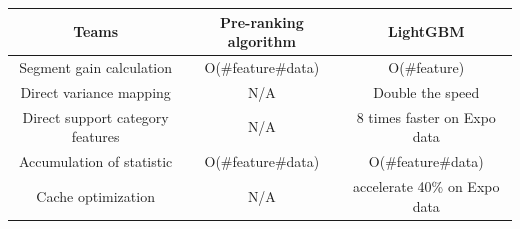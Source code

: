 \documentclass{tikzposter} %
\begin{document}
\begin{columns}
{\begin{tabular}{ c | c | c }
    \toprule
    Teams                               & Pre-ranking algorithm     &  LightGBM    \\
    \toprule
    Segment gain calculation            & O(\#feature\#data)        & O(\#feature) \\       
    Direct variance mapping             & N/A                       & Double the speed                        \\
    Direct support category features    & N/A                       & 8 times faster on Expo data    \\
    Accumulation of statistic           & O(\#feature\#data)        & O(\#feature\#data)                   \\
    Cache optimization                  & N/A                       & accelerate 40\% on Expo data          \\
    \bottomrule
\end{tabular}
        


}



\end{columns}
\end{document}
